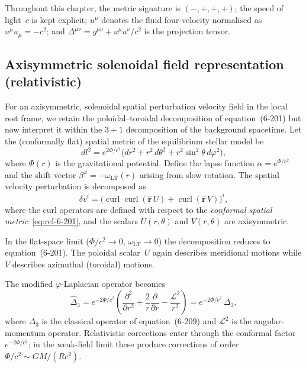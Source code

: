 Throughout this chapter, the metric signature is $(-,+,+,+)$; the
speed of light~$c$ is kept explicit; $u^{\mu}$ denotes the fluid
four-velocity normalised as $u^{\mu}u_{\mu} = -c^{2}$; and
$\Delta^{\mu\nu} = g^{\mu\nu} + u^{\mu}u^{\nu}/c^{2}$ is the
projection tensor.

\subsection{Axisymmetric solenoidal field representation
  (relativistic)}\label{sec:rel-61a}

For an axisymmetric, solenoidal spatial perturbation velocity field
in the local rest frame, we retain the poloidal--toroidal
decomposition of equation~(6-201) but now interpret it within the
$3+1$ decomposition of the background spacetime.  Let the
(conformally flat) spatial metric of the equilibrium stellar model be
\begin{equation}\label{eq:rel-6-201}
  dl^{2} = e^{2\Phi/c^{2}}
    \bigl(dr^{2} + r^{2}\,d\theta^{2} + r^{2}\sin^{2}\!\theta\,
    d\varphi^{2}\bigr),
\end{equation}
where $\Phi(r)$ is the gravitational potential.  Define the lapse
function $\alpha = e^{\Phi/c^{2}}$ and the shift vector
$\beta^{\varphi} = -\omega_{\mathrm{LT}}(r)$ arising from slow
rotation.  The spatial velocity perturbation is decomposed as
\begin{equation}\label{eq:rel-6-202}
  \delta v^{i}
  = \bigl(\operatorname{curl}\operatorname{curl}
    (\hat{\boldsymbol{r}}\,U)
    + \operatorname{curl}(\hat{\boldsymbol{r}}\,V)\bigr)^{i},
\end{equation}
where the curl operators are defined with respect to the
\emph{conformal spatial metric}~\eqref{eq:rel-6-201}, and the
scalars $U(r,\theta)$ and $V(r,\theta)$ are axisymmetric.

In the flat-space limit ($\Phi/c^{2}\to 0$,
$\omega_{\mathrm{LT}}\to 0$) the decomposition reduces to
equation~(6-201).  The poloidal scalar~$U$ again describes
meridional motions while $V$ describes azimuthal (toroidal) motions.

The modified $\varphi$-Laplacian operator becomes
\begin{equation}\label{eq:rel-6-203}
  \hat{\Delta}_{3}
  = e^{-2\Phi/c^{2}}\!\left(
    \frac{\partial^{2}}{\partial r^{2}}
    + \frac{2}{r}\frac{\partial}{\partial r}
    - \frac{\mathscr{L}^{2}}{r^{2}}\right)
  = e^{-2\Phi/c^{2}}\,\Delta_{3},
\end{equation}
where $\Delta_{3}$ is the classical operator of equation~(6-209)
and $\mathscr{L}^{2}$ is the angular-momentum operator.
Relativistic corrections enter through the conformal factor
$e^{-2\Phi/c^{2}}$; in the weak-field limit these produce
corrections of order $\Phi/c^{2} \sim GM/(Rc^{2})$.

